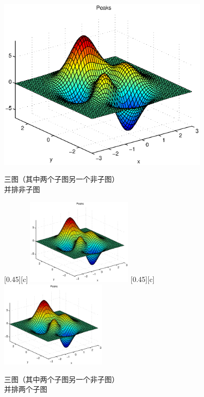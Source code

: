 \documentclass{article}
\begin{document}
    \begin{figure}[!htbp]
        \centering
        \begin{minipage}[b]{0.45\linewidth}
            \centering
            \includegraphics[width=0.9\textwidth]{example}
            \caption{三图（其中两个子图另一个非子图）\\并排非子图}
            \label{}
        \end{minipage}%
        \begin{minipage}[b]{0.45\linewidth}
            [0.45\textwidth][c]{
                \centering
                \includegraphics[width=0.45\textwidth]{example}
                \label{}
            }%
            \hspace{0.02cm} %
            [0.45\textwidth][c]{
                \centering
                \includegraphics[width=0.45\textwidth]{example}
                \label{}
            } 
            \caption{三图（其中两个子图另一个非子图）\\并排两个子图}
            \label{}
        \end{minipage}
    \end{figure}
\end{document}
